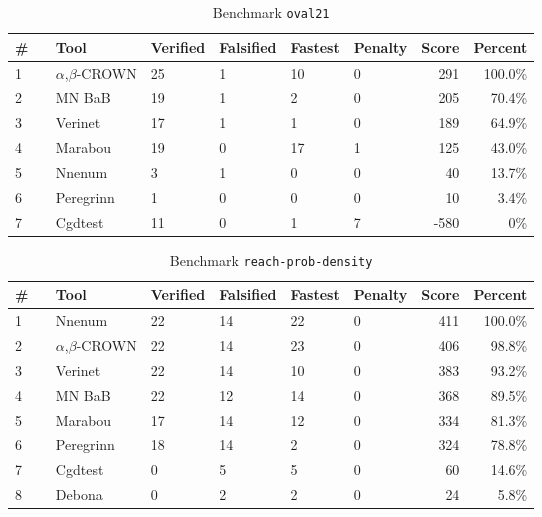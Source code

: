 
\begin{table}[h]
\begin{center}
\caption{Benchmark \texttt{oval21}} \label{tab:cat_{cat}}
{\setlength{\tabcolsep}{2pt}
\begin{tabular}[h]{@{}llllllrr@{}}
\toprule
\textbf{\# ~} & \textbf{Tool} & \textbf{Verified} & \textbf{Falsified} & \textbf{Fastest} & \textbf{Penalty} & \textbf{Score} & \textbf{Percent}\\
\midrule
1 & $\alpha$,$\beta$-CROWN & 25 & 1 & 10 & 0 & 291 & 100.0\% \\
2 & MN BaB & 19 & 1 & 2 & 0 & 205 & 70.4\% \\
3 & Verinet & 17 & 1 & 1 & 0 & 189 & 64.9\% \\
4 & Marabou & 19 & 0 & 17 & 1 & 125 & 43.0\% \\
5 & Nnenum & 3 & 1 & 0 & 0 & 40 & 13.7\% \\
6 & Peregrinn & 1 & 0 & 0 & 0 & 10 & 3.4\% \\
7 & Cgdtest & 11 & 0 & 1 & 7 & -580 & 0\% \\
\bottomrule
\end{tabular}
}
\end{center}
\end{table}




\begin{table}[h]
\begin{center}
\caption{Benchmark \texttt{reach-prob-density}} \label{tab:cat_{cat}}
{\setlength{\tabcolsep}{2pt}
\begin{tabular}[h]{@{}llllllrr@{}}
\toprule
\textbf{\# ~} & \textbf{Tool} & \textbf{Verified} & \textbf{Falsified} & \textbf{Fastest} & \textbf{Penalty} & \textbf{Score} & \textbf{Percent}\\
\midrule
1 & Nnenum & 22 & 14 & 22 & 0 & 411 & 100.0\% \\
2 & $\alpha$,$\beta$-CROWN & 22 & 14 & 23 & 0 & 406 & 98.8\% \\
3 & Verinet & 22 & 14 & 10 & 0 & 383 & 93.2\% \\
4 & MN BaB & 22 & 12 & 14 & 0 & 368 & 89.5\% \\
5 & Marabou & 17 & 14 & 12 & 0 & 334 & 81.3\% \\
6 & Peregrinn & 18 & 14 & 2 & 0 & 324 & 78.8\% \\
7 & Cgdtest & 0 & 5 & 5 & 0 & 60 & 14.6\% \\
8 & Debona & 0 & 2 & 2 & 0 & 24 & 5.8\% \\
\bottomrule
\end{tabular}
}
\end{center}
\end{table}



